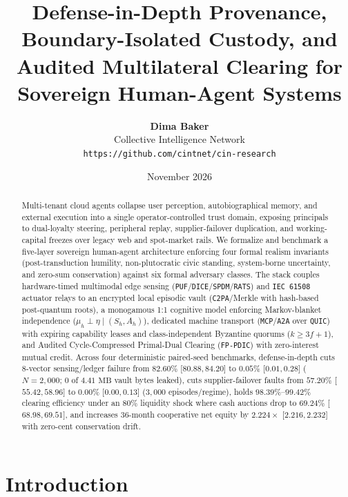 \documentclass[11pt]{article}
\title{Defense-in-Depth Provenance, Boundary-Isolated Custody, and Audited Multilateral Clearing for Sovereign Human-Agent Systems}
\author{\textbf{Dima Baker}\\
Collective Intelligence Network\\
\texttt{https://github.com/cintnet/cin-research}}
\date{November 2026}
\begin{document}
\maketitle

\begin{abstract}
Multi-tenant cloud agents collapse user perception, autobiographical memory, and external execution into a single operator-controlled trust domain, exposing principals to dual-loyalty steering, peripheral replay, supplier-failover duplication, and working-capital freezes over legacy web and spot-market rails. We formalize and benchmark a five-layer sovereign human-agent architecture enforcing four formal realism invariants (post-transduction humility, non-plutocratic civic standing, system-borne uncertainty, and zero-sum conservation) against six formal adversary classes. The stack couples hardware-timed multimodal edge sensing (\texttt{PUF}/\texttt{DICE}/\texttt{SPDM}/\texttt{RATS}) and \texttt{IEC 61508} actuator relays to an encrypted local episodic vault (\texttt{C2PA}/Merkle with hash-based post-quantum roots), a monogamous 1:1 cognitive model enforcing Markov-blanket independence ($\mu_h \perp \eta \mid (S_h, A_h)$), dedicated machine transport (\texttt{MCP}/\texttt{A2A} over \texttt{QUIC}) with expiring capability leases and class-independent Byzantine quorums ($k \ge 3f+1$), and Audited Cycle-Compressed Primal-Dual Clearing (\texttt{FP-PDIC}) with zero-interest mutual credit. Across four deterministic paired-seed benchmarks, defense-in-depth cuts 8-vector sensing/ledger failure from $82.60\%$ [$80.88, 84.20$] to $0.05\%$ [$0.01, 0.28$] ($N=2{,}000$; $0$ of $4.41\text{ MB}$ vault bytes leaked), cuts supplier-failover faults from $57.20\%$ [$55.42, 58.96$] to $0.00\%$ [$0.00, 0.13$] ($3{,}000$ episodes/regime), holds $98.39\%$--$99.42\%$ clearing efficiency under an $80\%$ liquidity shock where cash auctions drop to $69.24\%$ [$68.98, 69.51$], and increases 36-month cooperative net equity by $2.224\times$ [$2.216, 2.232$] with zero-cent conservation drift.
\end{abstract}

\section{Introduction}\label{sec:intro}
\end{document}
